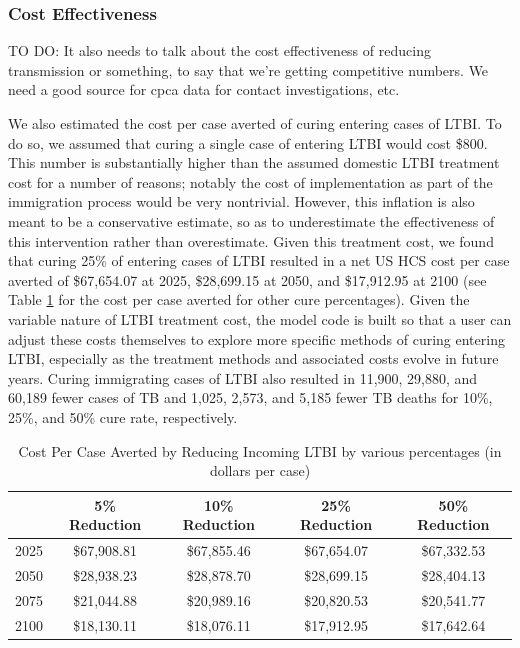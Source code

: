 \documentclass{amsart}
\renewcommand{\(}{\left(}
\renewcommand{\)}{\right)}
\newcommand{\TODO}[1]{\begin{framed}{\huge \color{red} TO DO:}
  #1 \end{framed}}
\begin{document}
\subsubsection{Cost Effectiveness}
\TODO{It also needs to talk about the cost effectiveness of reducing
  transmission or something, to say that we're getting competitive numbers. We
need a good source for cpca data for contact investigations, etc.}
We also estimated the cost per case averted of curing entering cases of LTBI. To
do so, we assumed that curing a single case of entering LTBI would cost \$800.
This number is substantially higher than the assumed domestic LTBI treatment
cost for a number of reasons; notably the cost of implementation as part of the
immigration process would be very nontrivial. However, this inflation is also
meant to be a conservative estimate, so as to underestimate the effectiveness of
this intervention rather than overestimate. Given this treatment cost, we found
that curing 25\% of entering cases of LTBI resulted in a net US HCS cost per
case averted of \$67,654.07 at 2025, \$28,699.15 at 2050, and
\$17,912.95 at 2100 (see Table \ref{tab:redEnLTBICosts} for the cost per case
averted for other cure percentages). Given the variable nature of LTBI treatment
cost, the model code is built so that a user can adjust these costs themselves
to explore more specific methods of curing entering LTBI, especially as the
treatment methods and associated costs evolve in future years. Curing
immigrating cases of LTBI  also resulted in 11,900, 29,880, and 60,189 fewer
cases of TB and 1,025, 2,573, and 5,185 fewer TB deaths for 10\%, 25\%, and 50\%
cure rate, respectively.


\begin{table}
\centering
\begin{tabular}{|r|cccc|} \hline
      &5\% Reduction&10\% Reduction&25\% Reduction&50\% Reduction\\\hline
  2025& \$67,908.81 & \$67,855.46 & \$67,654.07 & \$67,332.53 \\ 
  2050& \$28,938.23 & \$28,878.70 & \$28,699.15 & \$28,404.13 \\ 
  2075& \$21,044.88 & \$20,989.16 & \$20,820.53 & \$20,541.77 \\ 
  2100& \$18,130.11 & \$18,076.11 & \$17,912.95 & \$17,642.64 \\ \hline
\end{tabular}
\caption{Cost Per Case Averted by Reducing Incoming LTBI by various percentages
(in dollars per case)} 
\label{tab:redEnLTBICosts}
\end{table}
\end{document}
